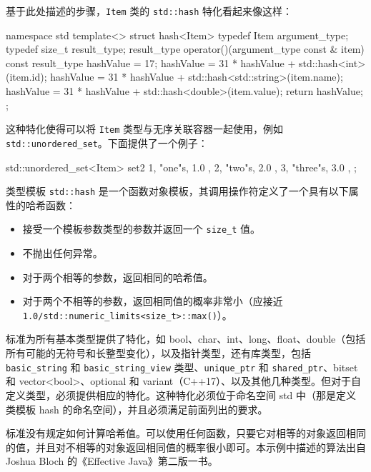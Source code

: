 基于此处描述的步骤，\verb|Item| 类的 \verb|std::hash| 特化看起来像这样：

\begin{cpp}
namespace std
{
    template<>
    struct hash<Item>
    {
        typedef Item argument_type;
        typedef size_t result_type;
        result_type operator()(argument_type const & item) const
        {
            result_type hashValue = 17;
            hashValue = 31 * hashValue + std::hash<int>{}(item.id);
            hashValue = 31 * hashValue + std::hash<std::string>{}(item.name);
            hashValue = 31 * hashValue + std::hash<double>{}(item.value);
            return hashValue;
        }
    };
}
\end{cpp}

这种特化使得可以将 \verb|Item| 类型与无序关联容器一起使用，例如 \verb|std::unordered_set|。下面提供了一个例子：

\begin{cpp}
std::unordered_set<Item> set2
{
    { 1, "one"s, 1.0 },
    { 2, "two"s, 2.0 },
    { 3, "three"s, 3.0 },
};
\end{cpp}


类型模板 \verb|std::hash| 是一个函数对象模板，其调用操作符定义了一个具有以下属性的哈希函数：

\begin{itemize}
\item
接受一个模板参数类型的参数并返回一个 \verb|size_t| 值。

\item
不抛出任何异常。

\item
对于两个相等的参数，返回相同的哈希值。

\item
对于两个不相等的参数，返回相同值的概率非常小（应接近 \verb|1.0/std::numeric_limits<size_t>::max()|）。
\end{itemize}

标准为所有基本类型提供了特化，如 bool、char、int、long、float、double（包括所有可能的无符号和长整型变化），以及指针类型，还有库类型，包括 \verb|basic_string| 和 \verb|basic_string_view| 类型、\verb|unique_ptr| 和 \verb|shared_ptr|、bitset 和 vector<bool>、optional 和 variant（C++17）、以及其他几种类型。但对于自定义类型，必须提供相应的特化。这种特化必须位于命名空间 std 中（那是定义类模板 hash 的命名空间），并且必须满足前面列出的要求。

标准没有规定如何计算哈希值。可以使用任何函数，只要它对相等的对象返回相同的值，并且对不相等的对象返回相同值的概率很小即可。本示例中描述的算法出自 Joshua Bloch 的《Effective Java》第二版一书。

